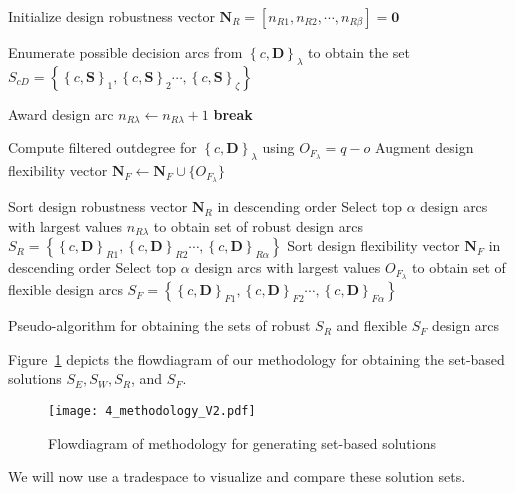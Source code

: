 \begin{algorithm*}
	\DontPrintSemicolon %
	Initialize design robustness vector $\mathbf{N}_R = \left[n_{R1},n_{R2},\cdots,n_{R\beta}\right] = \mathbf{0}$\;	
	 {
		Enumerate possible decision arcs from $\left\{c,\mathbf{D}\right\}_\lambda$ to obtain the set $S_{cD} = \left\{\left\{c,\mathbf{S}\right\}_{1},\left\{c,\mathbf{S}\right\}_{2}\cdots,\left\{c,\mathbf{S}\right\}_{\zeta}\right\}$\;
		 {
			 {
				
				 {
					Award design arc $n_{R\lambda} \gets n_{R\lambda} + 1$\;
					\textbf{break}
				}
			
			}
		}
		Compute filtered outdegree for $\left\{c,\mathbf{D}\right\}_\lambda$ using $O_{F_{\lambda}} = q - o$\;
		Augment design flexibility vector $\mathbf{N}_F \gets \mathbf{N}_F \cup \{ O_{F_{\lambda}} \} $\;
	}
	Sort design robustness vector $\mathbf{N}_R$ in descending order\;
	Select top $\alpha$ design arcs with largest values $n_{R\lambda}$ to obtain set of robust design arcs $S_R = \left\{\left\{c,\mathbf{D}\right\}_{R1},\left\{c,\mathbf{D}\right\}_{R2}\cdots,\left\{c,\mathbf{D}\right\}_{R\alpha}\right\}$\;
	Sort design flexibility vector $\mathbf{N}_F$ in descending order\;
	Select top $\alpha$ design arcs with largest values $O_{F_{\lambda}}$ to obtain set of flexible design arcs $S_F = \left\{\left\{c,\mathbf{D}\right\}_{F1},\left\{c,\mathbf{D}\right\}_{F2}\cdots,\left\{c,\mathbf{D}\right\}_{F\alpha}\right\}$\;
	\caption{Pseudo-algorithm for obtaining the sets of robust $S_{R}$ and flexible $S_{F}$ design arcs}
	\label{algo:SBDRobustalgo}
\end{algorithm*}

Figure~\ref{fig:methodology} depicts the flowdiagram of our methodology for obtaining the set-based solutions $S_E,S_W,S_R$, and $S_F$.
%
\begin{figure}[h!]
	\centering
	\texttt{[image: 4\_methodology\_V2.pdf]}
	\caption{Flowdiagram of methodology for generating set-based solutions}
	\label{fig:methodology}
\end{figure}
%
We will now use a tradespace to visualize and compare these solution sets.

